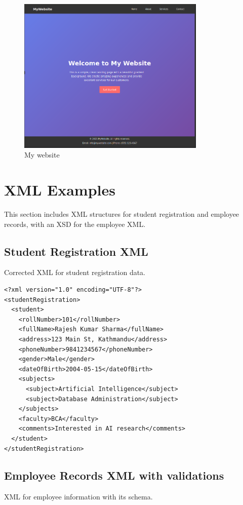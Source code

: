 \documentclass[a4paper,12pt]{article}
\begin{document}
\begin{figure}[h]
    \centering
    \includegraphics[width=0.8\textwidth]{13_screenshot.png}
    \caption{My website}
\end{figure}


\section{XML Examples}
This section includes XML structures for student registration and employee records, with an XSD for the employee XML.

\subsection{Student Registration XML}
Corrected XML for student registration data.

\lstset{language=XML}
\begin{lstlisting}
<?xml version="1.0" encoding="UTF-8"?>
<studentRegistration>
  <student>
    <rollNumber>101</rollNumber>
    <fullName>Rajesh Kumar Sharma</fullName>
    <address>123 Main St, Kathmandu</address>
    <phoneNumber>9841234567</phoneNumber>
    <gender>Male</gender>
    <dateOfBirth>2004-05-15</dateOfBirth>
    <subjects>
      <subject>Artificial Intelligence</subject>
      <subject>Database Administration</subject>
    </subjects>
    <faculty>BCA</faculty>
    <comments>Interested in AI research</comments>
  </student>
</studentRegistration>
\end{lstlisting}

\subsection{Employee Records XML with validations}
XML for employee information with its schema.
\end{document}
